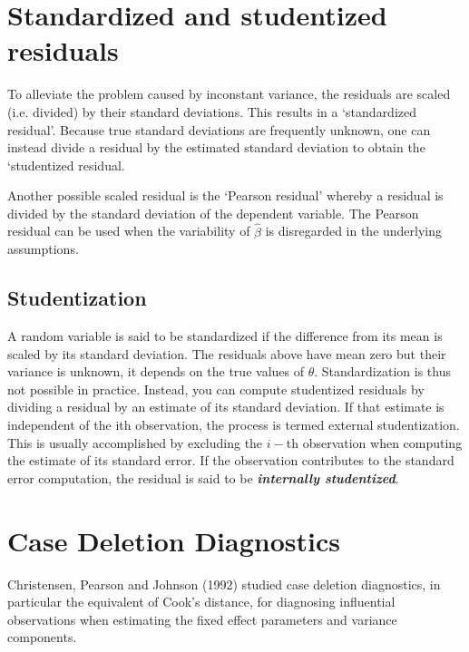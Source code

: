 \documentclass[12pt, a4paper]{report}
\theoremstyle{plain}
\theoremstyle{definition}
\theoremstyle{remark}
\begin{document}
\newpage
\section{Standardized and studentized residuals} %
To alleviate the problem caused by inconstant variance, the residuals are scaled (i.e. divided) by their standard deviations. This results in a `standardized residual'. Because true standard deviations are frequently unknown, one can instead divide a residual by the estimated standard deviation to obtain the `studentized residual. 

Another possible scaled residual is the  `Pearson residual' whereby a residual is divided by the standard deviation of the dependent variable. The Pearson residual can be used when the variability of $\hat{\beta}$ is disregarded in the underlying assumptions.

\subsection{Studentization} %

A random variable is said to be standardized if the difference from its mean is scaled by its standard
deviation. The residuals above have mean zero but their variance is unknown, it depends on the true values
of $\theta$. Standardization is thus not possible in practice.
Instead, you can compute studentized residuals
by dividing a residual by an estimate of its standard deviation. If that estimate is independent of the ith
observation, the process is termed external studentization.
This is usually accomplished by excluding the
$i-$th observation when computing the estimate of its standard error. If the observation contributes to the
standard error computation, the residual is said to be \textbf{\emph{internally studentized}}.
\newpage
\section{Case Deletion Diagnostics} %

Christensen, Pearson and Johnson (1992) studied  case deletion diagnostics, in particular the equivalent of Cook's distance, for diagnosing influential observations when estimating the fixed effect parameters and variance components.
\end{document}
